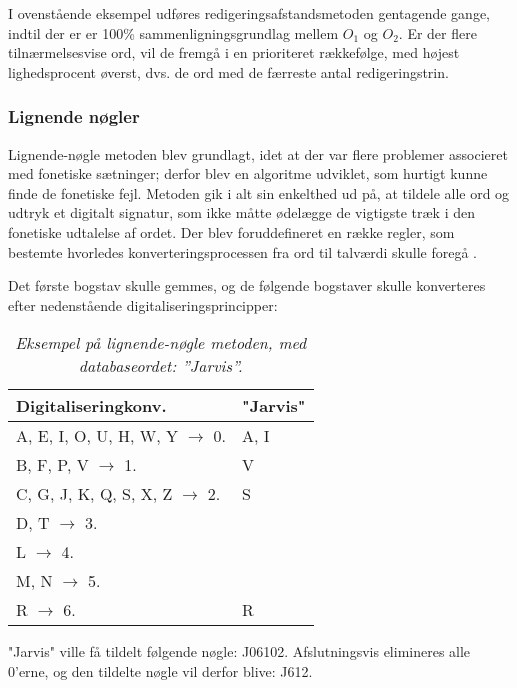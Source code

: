 I ovenstående eksempel udføres redigeringsafstandsmetoden gentagende gange, indtil der er er 100\% sammenligningsgrundlag mellem $O_1$ og $O_2$. Er der flere tilnærmelsesvise ord, vil de fremgå i en prioriteret rækkefølge, med højest lighedsprocent øverst, dvs. de ord med de færreste antal redigeringstrin.

\subsubsection{Lignende nøgler} %
Lignende-nøgle metoden blev grundlagt, idet at der var flere problemer associeret med fonetiske sætninger; derfor blev en algoritme udviklet, som hurtigt kunne finde de fonetiske fejl. Metoden gik i alt sin enkelthed ud på, at tildele alle ord og udtryk et digitalt signatur, som ikke måtte ødelægge de vigtigste træk i den fonetiske udtalelse af ordet. Der blev foruddefineret en række regler, som bestemte hvorledes konverteringsprocessen fra ord til talværdi skulle foregå \cite{UnifiedSpellCheck}.
\clearpage

Det første bogstav skulle gemmes, og de følgende bogstaver skulle konverteres efter nedenstående digitaliseringsprincipper: \\

\begin{table}[h]
    \centering
    \begin{tabular}{ l | l }
        Digitaliseringkonv. & "Jarvis" \\
        \hline \hline
        A, E, I, O, U, H, W, Y $\rightarrow$ 0. & A, I \\
        \hline
        B, F, P, V $\rightarrow$ 1. & V \\
        \hline 
        C, G, J, K, Q, S, X, Z $\rightarrow$ 2. & S \\
        \hline 
        D, T $\rightarrow$ 3. & \\
        \hline 
        L $\rightarrow$ 4. & \\
        \hline 
        M, N $\rightarrow$ 5. & \\
        \hline 
        R $\rightarrow$ 6. & R \\
        \hline 
    \end{tabular}
    \caption{\textit{Eksempel på lignende-nøgle metoden, med databaseordet: ”Jarvis”. \tabelgroup}}
\end{table}

"Jarvis" ville få tildelt følgende nøgle: J06102. Afslutningsvis elimineres alle 0’erne, og den tildelte nøgle vil derfor blive: J612.

